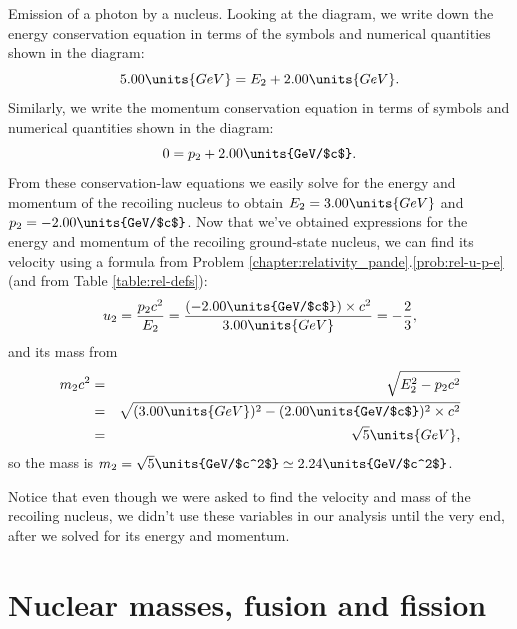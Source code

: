 \begin{example}{Emission of a photon by a nucleus.}
Looking at the diagram, we write down the energy conservation equation
in terms of the symbols and numerical quantities shown in the
diagram:
\[ 5.00\units{GeV} = E_2 + 2.00\units{GeV}. \]
Similarly, we write the momentum conservation equation in terms of
symbols and numerical quantities shown in the diagram:
\[ 0 = p_2 + 2.00\units{GeV/$c$}.  \] From these conservation-law
equations we easily solve for the energy and momentum of the recoiling
nucleus to obtain $E_2 = 3.00\units{GeV}$ and $p_2 =
-2.00\units{GeV/$c$}$.  Now that we've obtained expressions for the
energy and momentum of the recoiling ground-state nucleus, we can find
its velocity using a formula from Problem
\ref{chapter:relativity_pande}.\ref{prob:rel-u-p-e} (and from Table
\ref{table:rel-defs}):
\[ u_2 = \frac{p_2c^2}{E_2} = \frac{(-2.00\units{GeV/$c$})\times c^2}
           {3.00\units{GeV}} = -\frac{2}{3}, \]
and its mass from 
\begin{eqnarray}
m_2c^2 &=& \sqrt{E_2^2 - p_2c^2} \nonumber \\
       &=& \sqrt{(3.00\units{GeV})^2 - (2.00\units{GeV/$c$})^2 \times
            c^2} \nonumber \\
       &=& \sqrt{5}\units{GeV}, \nonumber 
\end{eqnarray}
so the mass is $m_2 = \sqrt{5}\units{GeV/$c^2$}\simeq 2.24\units{GeV/$c^2$}$.

Notice that even though we were asked to find the velocity and mass
of the recoiling nucleus, we didn't use these variables in our
analysis until the very end, after we solved for its energy and
momentum.
\end{example}

\section[Fusion and fission]{Nuclear masses, fusion and fission}


